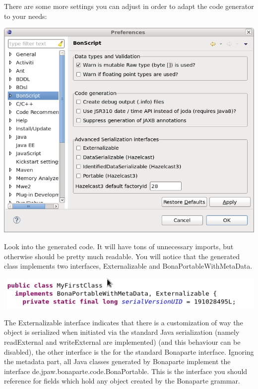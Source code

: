 \documentclass[11pt,a4paper,oneside]{article}
\begin{document}
There are some more settings you can adjust in order to adapt the code generator to your needs:

\vspace{2mm}
\begin{center}
\includegraphics[scale=0.5]{images/tut1-prefs2.png}
\end{center}
 
Look into the generated code. It will have tons of unnecessary imports, but otherwise should be pretty much readable.
You will notice that the generated class implements two interfaces, {\ttfamily Externalizable} and {\ttfamily BonaPortableWithMetaData}.

\vspace{2mm}
\hspace{1cm}\includegraphics[scale=0.5]{images/tut1-004.png}

\noindent 
The {\ttfamily Externalizable} interface indicates that there is a customization of way the object is serialized when initiated
via the standard Java serialization (namely {\ttfamily readExternal} and {\ttfamily writeExternal} are implemented) (and this behaviour can be disabled),
the other interface is the for the standard Bonaparte interface. Ignoring the metadata part, all Java classes generated by Bonaparte implement the interface
 {\ttfamily de.jpaw.bonaparte.code.BonaPortable}. This is the interface you should reference for fields which hold any object created by the Bonaparte grammar.
\end{document}

